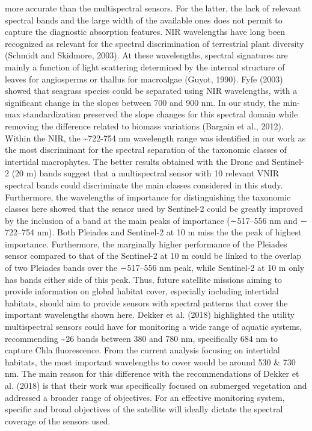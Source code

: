 \documentclass[
  letterpaper,
  11pt,
  english,
  singlespacing,
  headsepline]{MastersDoctoralThesis}
\begin{document}
\begin{spacing}{1.5}
more accurate than the multispectral sensors. For the latter, the lack
of relevant spectral bands and the large width of the available ones
does not permit to capture the diagnostic absorption features. NIR
wavelengths have long been recognized as relevant for the spectral
discrimination of terrestrial plant diversity (Schmidt and Skidmore,
2003). At these wavelengths, spectral signatures are mainly a function
of light scattering determined by the internal structure of leaves for
angiosperms or thallus for macroalgae (Guyot, 1990). Fyfe (2003) showed
that seagrass species could be separated using NIR wavelengths, with a
significant change in the slopes between 700 and 900 nm. In our study,
the min-max standardization preserved the slope changes for this
spectral domain while removing the difference related to biomass
variations (Bargain et al., 2012). Within the NIR, the
\textasciitilde722-754 nm wavelength range was identified in our work as
the most discriminant for the spectral separation of the taxonomic
classes of intertidal macrophytes. The better results obtained with the
Drone and Sentinel-2 (20 m) bands suggest that a multispectral sensor
with 10 relevant VNIR spectral bands could discriminate the main classes
considered in this study. Furthermore, the wavelengths of importance for
distinguishing the taxonomic classes here showed that the sensor used by
Sentinel-2 could be greatly improved by the inclusion of a band at the
main peaks of importance (∼517--556 nm and ∼ 722--754 nm). Both Pleiades
and Sentinel-2 at 10 m miss the the peak of highest importance.
Furthermore, the marginally higher performance of the Pleiades sensor
compared to that of the Sentinel-2 at 10 m could be linked to the
overlap of two Pleiades bands over the ∼517--556 nm peak, while
Sentinel-2 at 10 m only has bands either side of this peak. Thus, future
satellite missions aiming to provide information on global habitat
cover, especially including intertidal habitats, should aim to provide
sensors with spectral patterns that cover the important wavelengths
shown here. Dekker et al. (2018) highlighted the utility multispectral
sensors could have for monitoring a wide range of aquatic systems,
recommending \textasciitilde26 bands between 380 and 780 nm,
specifically 684 nm to capture Chla fluorescence. From the current
analysis focusing on intertidal habitats, the most important wavelengths
to cover would be around 530 \& 730 nm. The main reason for this
difference with the recommendations of Dekker et al. (2018) is that
their work was specifically focused on submerged vegetation and
addressed a broader range of objectives. For an effective monitoring
system, specific and broad objectives of the satellite will ideally
dictate the spectral coverage of the sensors used.


\end{spacing}
\end{document}
